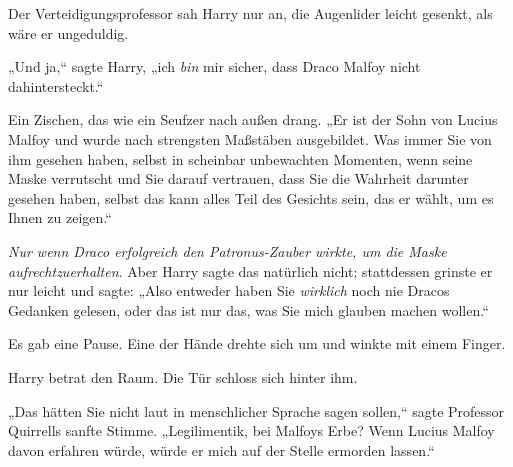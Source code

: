 Der Verteidigungsprofessor sah Harry nur an, die Augenlider leicht gesenkt, als wäre er ungeduldig.

„Und ja,“ sagte Harry, „ich \emph{bin} mir sicher, dass Draco Malfoy nicht dahintersteckt.“

Ein Zischen, das wie ein Seufzer nach außen drang. „Er ist der Sohn von Lucius Malfoy und wurde nach strengsten Maßstäben ausgebildet. Was immer Sie von ihm gesehen haben, selbst in scheinbar unbewachten Momenten, wenn seine Maske verrutscht und Sie darauf vertrauen, dass Sie die Wahrheit darunter gesehen haben, selbst das kann alles Teil des Gesichts sein, das er wählt, um es Ihnen zu zeigen.“

\emph{Nur wenn Draco erfolgreich den Patronus-Zauber wirkte, um die Maske aufrechtzuerhalten}. Aber Harry sagte das natürlich nicht; stattdessen grinste er nur leicht und sagte: „Also entweder haben Sie \emph{wirklich} noch nie Dracos Gedanken gelesen, oder das ist nur das, was Sie mich glauben machen wollen.“

Es gab eine Pause. Eine der Hände drehte sich um und winkte mit einem Finger.

Harry betrat den Raum. Die Tür schloss sich hinter ihm.

„Das hätten Sie nicht laut in menschlicher Sprache sagen sollen,“ sagte Professor Quirrells sanfte Stimme. „Legilimentik, bei Malfoys Erbe? Wenn Lucius Malfoy davon erfahren würde, würde er mich auf der Stelle ermorden lassen.“

